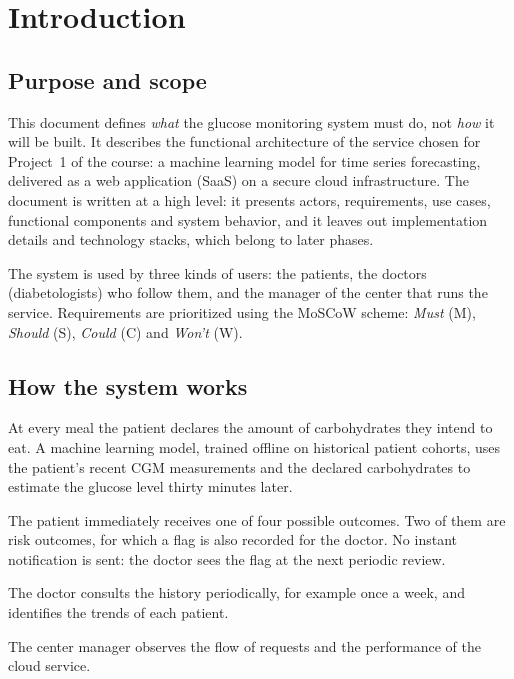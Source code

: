 \chapter{Introduction}
\label{chap:introduzione}


\section{Purpose and scope}
This document defines \emph{what} the glucose monitoring system must do, not
\emph{how} it will be built. It describes the functional architecture of the service
chosen for Project~1 of the course: a machine learning model for time series
forecasting, delivered as a web application (SaaS) on a secure cloud
infrastructure. The document is written at a high level: it presents actors,
requirements, use cases, functional components and system behavior, and it
leaves out implementation details and technology stacks, which belong to later phases.

The system is used by three kinds of users: the patients, the doctors
(diabetologists) who follow them, and the manager of the center that runs the
service. Requirements are prioritized using the MoSCoW scheme: \emph{Must}
(M), \emph{Should} (S), \emph{Could} (C) and \emph{Won't} (W).

\section{How the system works}
At every meal the patient declares the amount of carbohydrates they intend to eat. A machine learning model, trained offline on historical patient cohorts, uses the patient's recent CGM measurements and the declared carbohydrates to estimate the glucose level thirty minutes later. 

The patient immediately receives one of four possible outcomes. Two of them
are risk outcomes, for which a flag is also recorded for the doctor. No instant
notification is sent: the doctor sees the flag at the next periodic review.

The doctor consults the history periodically, for example once a week, and
identifies the trends of each patient. 


The center manager observes the flow of
requests and the performance of the cloud service.

